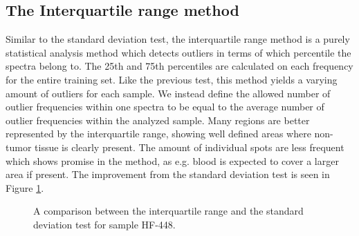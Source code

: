 \subsection{The Interquartile range method}

Similar to the standard deviation test, the interquartile range method is a purely statistical analysis method which detects outliers in terms of which percentile the spectra belong to. The 25th and 75th percentiles are calculated on each frequency for the entire training set. Like the previous test, this method yields a varying amount of outliers for each sample. We instead define the allowed number of outlier frequencies within one spectra to be equal to the average number of outlier frequencies within the analyzed sample. Many regions are better represented by the interquartile range, showing well defined areas where non-tumor tissue is clearly present. The amount of individual spots are less frequent which shows promise in the method, as e.g. blood is expected to cover a larger area if present. The improvement from the standard deviation test is seen in Figure \ref{fig:iqrHF448}.

\begin{figure}[H]

    \centering
    \qquad
    \caption{A comparison between the interquartile range and the standard deviation test for sample HF-448.
\label{fig:iqrHF448}}%
\end{figure}

